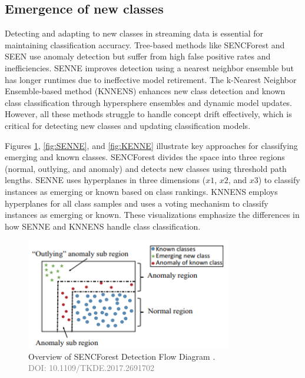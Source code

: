 \subsection{Emergence of new classes}
\label{sec:3_6_2_related_work_emergence}


Detecting and adapting to new classes in streaming data is essential for maintaining classification accuracy. Tree-based methods like SENCForest \cite{mu2017classification} and SEEN \cite{zhu2020semi} use anomaly detection but suffer from high false positive rates and inefficiencies. SENNE improves detection using a nearest neighbor ensemble but has longer runtimes due to ineffective model retirement. The k-Nearest Neighbor Ensemble-based method (KNNENS) \cite{zhang2022knnens} enhances new class detection and known class classification through hypersphere ensembles and dynamic model updates. However, all these methods struggle to handle concept drift effectively, which is critical for detecting new classes and updating classification models.

Figures \ref{fig:SENCForest}, \ref{fig:SENNE}, and \ref{fig:KENNE} illustrate key approaches for classifying emerging and known classes. SENCForest divides the space into three regions (normal, outlying, and anomaly) and detects new classes using threshold path lengths. SENNE uses hyperplanes in three dimensions ($x1$, $x2$, and $x3$) to classify instances as emerging or known based on class rankings. KNNENS employs hyperplanes for all class samples and uses a voting mechanism to classify instances as emerging or known. These visualizations emphasize the differences in how SENNE and KNNENS handle class classification.

\begin{figure}[!ht]
    \centering
    \includegraphics[width=0.80\textwidth]{3_State-of-the-art/fig/SENCForst.png}
    \caption{Overview of SENCForest Detection Flow Diagram \cite{mu2017classification}. \\
    \textcolor{gray}{\fontsize{10}{0}\selectfont DOI: 10.1109/TKDE.2017.2691702}}
    \label{fig:SENCForest}
\end{figure}
    

